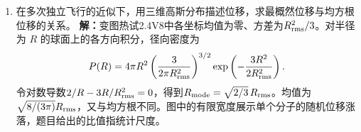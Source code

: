 \documentclass[UTF8,fontset=fandol,a4paper,11pt]{ctexart}
\begin{document}
\begin{enumerate}
\item 在多次独立飞行的近似下，用三维高斯分布描述位移，求最概然位移与均方根位移的关系。
\textbf{解：}变图热试2.4V8中各坐标均值为零、方差为$R_{\rm rms}^2/3$。对半径为 $R$ 的球面上的各方向积分，径向密度为
\[
P(R)=4\pi R^2
 \left(\frac{3}{2\pi R_{\rm rms}^2}\right)^{3/2}
 \exp\left(-\frac{3R^2}{2R_{\rm rms}^2}\right).
\]令对数导数$2/R-3R/R_{\rm rms}^2=0$，得到$R_{\rm mode}=\sqrt{2/3}\,R_{\rm rms}$。均值为$\sqrt{8/(3\pi)}R_{\rm rms}$，又与均方根不同。图中的有限宽度展示单个分子的随机位移涨落，题目给出的比值指统计尺度。
\begin{center}\begin{minipage}{.98\linewidth}\centering
{}
\end{minipage}
\end{center}
\end{enumerate}
\end{document}

